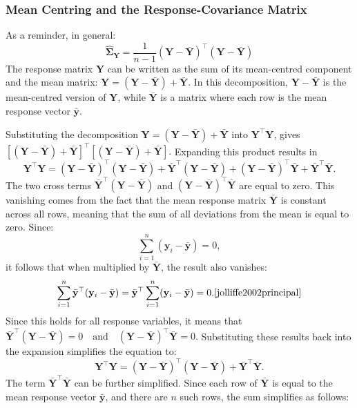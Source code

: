 \documentclass[11pt]{report} %
\begin{document}
\subsubsection{Mean Centring and the Response-Covariance Matrix}
\label{SVD Cov}
As a reminder, in general:
\[
\mathbf{\hat{\Sigma}_Y}=\frac{1}{n-1}(\mathbf{Y}-\bar{\mathbf{Y}})^\top (\mathbf{Y}-\bar{\mathbf{Y}})
\]
The response matrix \( \mathbf{Y} \) can be written as the sum of its mean-centred component and the mean matrix: $\mathbf{Y} = (\mathbf{Y} - \bar{\mathbf{Y}}) + \bar{\mathbf{Y}}.$
In this decomposition, \( \mathbf{Y} - \bar{\mathbf{Y}} \) is the mean-centred version of \( \mathbf{Y} \), while \( \bar{\mathbf{Y}} \) is a matrix where each row is the mean response vector \( \bar{\mathbf{y}} \).

Substituting the decomposition \( \mathbf{Y} = (\mathbf{Y} - \bar{\mathbf{Y}}) + \bar{\mathbf{Y}} \) into \( \mathbf{Y}^\top \mathbf{Y} \), gives $
   [(\mathbf{Y} - \bar{\mathbf{Y}}) + \bar{\mathbf{Y}}]^\top [(\mathbf{Y} - \bar{\mathbf{Y}}) + \bar{\mathbf{Y}}].$
Expanding this product results in
   \[
   \mathbf{Y}^\top \mathbf{Y} = (\mathbf{Y} - \bar{\mathbf{Y}})^\top (\mathbf{Y} - \bar{\mathbf{Y}}) + \bar{\mathbf{Y}}^\top (\mathbf{Y} - \bar{\mathbf{Y}}) + (\mathbf{Y} - \bar{\mathbf{Y}})^\top \bar{\mathbf{Y}} + \bar{\mathbf{Y}}^\top \bar{\mathbf{Y}}.
   \]
The two cross terms \( \bar{\mathbf{Y}}^\top (\mathbf{Y} - \bar{\mathbf{Y}}) \) and \( (\mathbf{Y} - \bar{\mathbf{Y}})^\top \bar{\mathbf{Y}} \) are equal to zero. This vanishing comes from the fact that the mean response matrix \( \bar{\mathbf{Y}} \) is constant across all rows, meaning that the sum of all deviations from the mean is equal to zero. Since:
   \[
   \sum_{i=1}^{n} (\mathbf{y}_i - \bar{\mathbf{y}}) = 0,
   \]
it follows that when multiplied by \( \bar{\mathbf{Y}} \), the result also vanishes:
\[
\sum_{i=1}^{n} \bar{\mathbf{y}}^\top (\mathbf{y}_i - \bar{\mathbf{y}}) = \bar{\mathbf{y}}^\top \sum_{i=1}^{n} (\mathbf{y}_i - \bar{\mathbf{y}}) = 0.\cite{jolliffe2002principal}
\]
Since this holds for all response variables, it means that $
   \bar{\mathbf{Y}}^\top (\mathbf{Y} - \bar{\mathbf{Y}}) = 0 \quad \text{and} \quad (\mathbf{Y} - \bar{\mathbf{Y}})^\top \bar{\mathbf{Y}} = 0.$
Substituting these results back into the expansion simplifies the equation to:
   \[
   \mathbf{Y}^\top \mathbf{Y} = (\mathbf{Y} - \bar{\mathbf{Y}})^\top (\mathbf{Y} - \bar{\mathbf{Y}}) + \bar{\mathbf{Y}}^\top \bar{\mathbf{Y}}.
   \]
The term \( \bar{\mathbf{Y}}^\top \bar{\mathbf{Y}} \) can be further simplified. Since each row of \( \bar{\mathbf{Y}} \) is equal to the mean response vector \( \bar{\mathbf{y}} \), and there are \( n \) such rows, the sum simplifies as follows:
\end{document}
